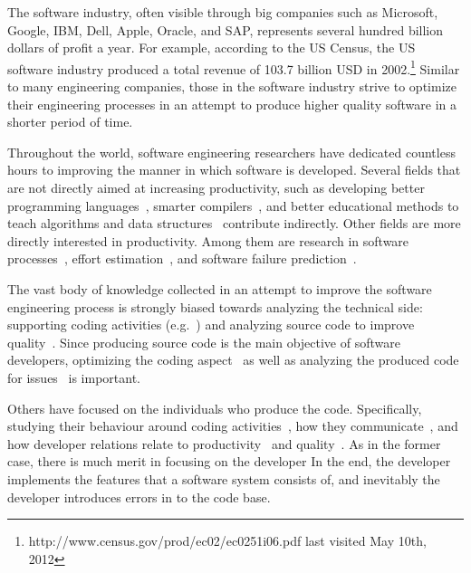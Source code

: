 The software industry, often visible through big companies such as Microsoft, Google, IBM, Dell, Apple, Oracle, and SAP, represents several hundred billion dollars of profit a year. 
For example, according to the US Census, the US software industry produced a total revenue of 103.7 billion USD in 2002.\footnote{http://www.census.gov/prod/ec02/ec0251i06.pdf last visited May 10th, 2012}
Similar to many engineering companies, those in the software industry strive to optimize their engineering processes in an attempt to produce higher quality software in a shorter period of time.

Throughout the world, software engineering researchers have dedicated countless hours to improving the manner in which software is developed.
Several fields that are not directly aimed at increasing productivity, such as developing better programming languages~\cite{conf:prog:lang}, smarter compilers~\cite{cong:comp:constr}, and better educational methods to teach algorithms and data structures~\cite{conf:sigcse} contribute indirectly.
Other fields are more directly interested in productivity.
Among them are research in software processes~\cite{conf:icssp}, effort estimation~\cite{molkken:isese:2003,boehm:analse:2000}, and software failure prediction~\cite{conf:promise}.

The vast body of knowledge collected in an attempt to improve the software engineering process is strongly biased towards analyzing the technical side: supporting coding activities (e.g.~\cite{bassil:iwpc:2001,mens:tse:2004}) and analyzing source code to improve quality~\cite{zimmermann:oopsla:2005,nagappan:icse:2006}. 
Since producing source code is the main objective of software developers, optimizing the coding aspect~\cite{bassil:iwpc:2001,mens:tse:2004} as well as analyzing the produced code for issues~\cite{nagappan:icse:2005,schroeter:isese:2006} is important.

Others have focused on the individuals who produce the code. Specifically, studying their behaviour around coding activities~\cite{latoza:icse:2006}, how they communicate~\cite{ko:icse:2007,gopal:2002:comacm}, and how developer relations relate to productivity~\cite{gopal:2002:comacm} and quality~\cite{abreu:iwpse:2009,wolf:icse:2009}.
As in the former case, there is much merit in focusing on the developer
In the end, the developer implements the features that a software system consists of, and inevitably the developer introduces errors in to the code base.

